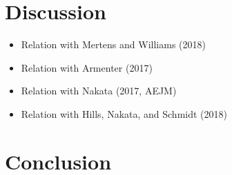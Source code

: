 \documentclass[11pt]{article}
\begin{document}
	\section{Discussion}
	\label{S:Discussion}
	
	\begin{itemize}
		\item Relation with Mertens and Williams (2018)
		\item Relation with Armenter (2017)
		\item Relation with Nakata (2017, AEJM)
		\item Relation with Hills, Nakata, and Schmidt (2018)
	\end{itemize}	
	
	\section{Conclusion}
	\label{S:Conclusion}
	
	
	
	\newpage
	
	
	
\end{document}
